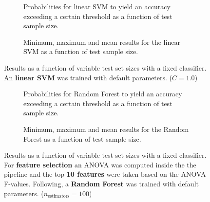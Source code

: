 \begin{figure}
    \captionsetup[subfigure]{justification=justified,singlelinecheck=false}
    \begin{subfigure}[t]{0.61\textwidth}
        
        \caption{Probabilities for linear SVM to yield an accuracy exceeding a certain threshold as a function of test sample size.}
    \end{subfigure}
    \hspace{3.0mm}
    \begin{subfigure}[t]{0.34\textwidth}
        
        \caption{Minimum, maximum and mean results for the linear SVM as a function of test sample size.}
    \end{subfigure}
    \caption[Effects of varying test sample size. Linear SVM; No preprocessing]{Results as a function of variable test set sizes with a fixed classifier. An \textbf{{linear SVM}} was trained with default parameters. ($C=\num{1.0}$)}
    \label{fig:no_PCA_no_selection_LinearSVC}
\end{figure}

\begin{figure}
    \captionsetup[subfigure]{justification=justified,singlelinecheck=false}
    \begin{subfigure}[t]{0.61\textwidth}
        
        \caption{Probabilities for Random Forest to yield an accuracy exceeding a certain threshold as a function of test sample size.}
    \end{subfigure}
    \hspace{3.0mm}
    \begin{subfigure}[t]{0.34\textwidth}
        
        \caption{Minimum, maximum and mean results for the Random Forest as a function of test sample size.}
    \end{subfigure}
    \caption[Effects of varying test sample size. Random Forest; Preprocessing: ANOVA feature selection ($k_\text{best} = \num{10}$)]{Results as a function of variable test set sizes with a fixed classifier. For \textbf{feature selection} an ANOVA was computed inside the the pipeline and the top \textbf{\num{10} features} were taken based on the ANOVA F-values. Following, a \textbf{{Random Forest}} was trained with default parameters. ($n_\text{estimators}=\num{100}$)}
    \label{fig:no_PCA_10_best_selected_RandomForest}
\end{figure}

